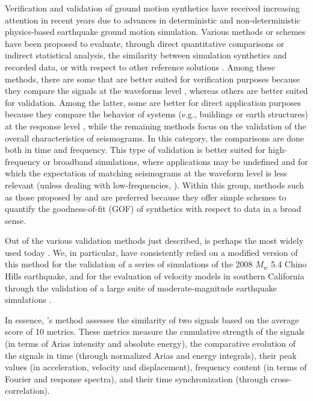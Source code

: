 
\introduction

Verification and validation of ground motion synthetics have received increasing attention in recent years due to advances in deterministic and non-deterministic physics-based earthquake ground motion simulation. Various methods or schemes have been proposed to evaluate, through direct quantitative comparisons or indirect statistical analysis, the similarity between simulation synthetics and recorded data, or with respect to other reference solutions \citep{Anderson_2004_Proc, Kristekova_2006_BSSA, Kristekova_2009_GJI, Olsen_2010_SRL, Burks_BSSA_2014, Rezaeian_2015_BSSA}. Among these methods, there are some that are better suited for verification purposes because they compare the signals at the waveforms level \citep{Kristekova_2006_BSSA, Kristekova_2009_GJI}, whereas others are better suited for validation. Among the latter, some are better for direct application purposes because they compare the behavior of systems (e.g., buildings or earth structures) at the response level \citep{Burks_BSSA_2014}, while the remaining methods focus on the validation of the overall characteristics of seismograms. In this category, the comparisons are done both in time and frequency. This type of validation is better suited for high-frequency or broadband simulations, where applications may be undefined and for which the expectation of matching seismograms at the waveform level is less relevant (unless dealing with low-frequencies, ). Within this group, methods such as those proposed by \citet{Anderson_2004_Proc} and \citet{Olsen_2010_SRL} are preferred because they offer simple schemes to quantify the goodness-of-fit (GOF) of synthetics with respect to data in a broad sense.

Out of the various validation methods just described, \citet{Anderson_2004_Proc} is perhaps the most widely used today \citep[e.g.,][]{Chaljub_2010_BSSA, Bielak_2010_GJI, Guidotti_2011_SRL, Maufroy_2015_BSSA}. We, in particular, have consistently relied on a modified version of this method for the validation of a series of simulations of the 2008 $M_w$ 5.4 Chino Hills earthquake, and for the evaluation of velocity models in southern California through the validation of a large suite of moderate-magnitude earthquake simulations \citep{Taborda_2013_BSSA, Taborda_2014_BSSA, Taborda_2016_GJI}. 

In essence, \citeauthor{Anderson_2004_Proc}'s method assesses the similarity of two signals based on the average score of 10 metrics. These metrics measure the cumulative strength of the signals (in terms of Arias intensity and absolute energy), the comparative evolution of the signals in time (through normalized Arias and energy integrals), their peak values (in acceleration, velocity and displacement), frequency content (in terms of Fourier and response spectra), and their time synchronization (through cross-correlation). 

